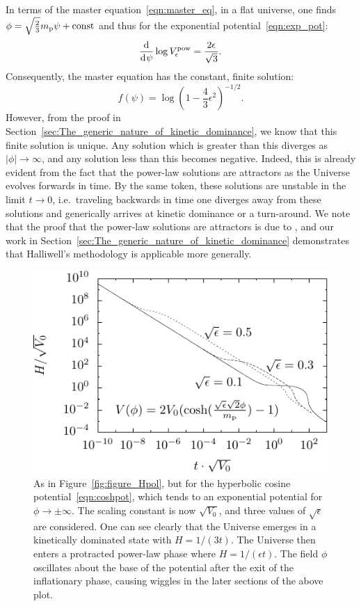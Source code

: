 In terms of the master equation~\eqref{eqn:master_eq}, in a flat universe, one finds $\phi = \sqrt{\frac{2}{3}}m_{\mathrm{p}} \psi + \mathrm{const} $ and thus for the exponential potential~\eqref{eqn:exp_pot}:
%
\begin{equation}
  \frac{\operatorname{d}^{}\!{}}{\operatorname{d}^{}\!{\psi}} \log V^\mathrm{pow}_\epsilon = \frac{2\epsilon}{\sqrt{3}}. 
\end{equation}
%
Consequently, the master equation has the constant, finite solution:
%
\begin{equation}
  f(\psi) = \log{\left(1-\frac{4}{3}\epsilon^2\right)}^{-1/2}.
  \label{eqn:uf_power_law}
\end{equation}
%
However, from the proof in Section~\ref{sec:The_generic_nature_of_kinetic_dominance}, we know that this finite solution is unique. Any solution which is greater than this diverges as $|\phi|\to\infty$, and any solution less than this becomes negative.  Indeed, this is already evident from the fact that the power-law solutions are attractors as the Universe evolves forwards in time. By the same token, these solutions are unstable in the limit $t \to 0$, i.e.\ traveling backwards in time one diverges away from these solutions and generically arrives at kinetic dominance or a turn-around.  We note that the proof that the power-law solutions are attractors is due to \citet{halliwell_scalar_1987}, and our work in Section~\ref{sec:The_generic_nature_of_kinetic_dominance} demonstrates that Halliwell's methodology is applicable more generally.

%
\begin{figure}[tp]
  \includegraphics[width=\textwidth]{chapters/kinetic_dominance/figures/Hlam}
  \caption{As in Figure~\protect\ref{fig:figure_Hpol}, but for the hyperbolic cosine potential~\protect\eqref{eqn:coshpot}, which tends to an exponential potential for $\phi \to \pm\infty$. The scaling constant is now $\sqrt{V_0}$, and three values of $\sqrt{\epsilon}$ are considered. One can see clearly that the Universe emerges in a kinetically dominated state with $H=1/(3t)$. The Universe then enters a protracted power-law phase where $H = 1/(\epsilon t)$. The field $\phi$ oscillates about the base of the potential after the exit of the inflationary phase, causing wiggles in the later sections of the above plot.\label{fig:figure_Hlam}}
\end{figure}
%

